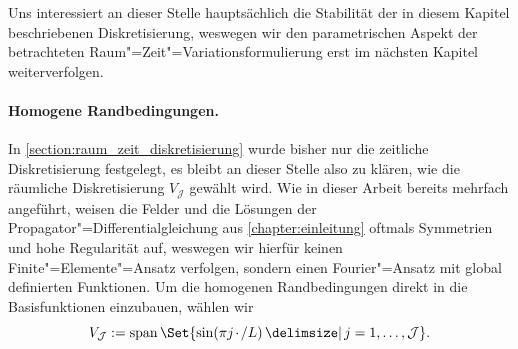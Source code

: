 \documentclass[../main.tex]{subfiles}
\begin{document}
Uns interessiert an dieser Stelle hauptsächlich die Stabilität der in diesem Kapitel beschriebenen Diskretisierung, weswegen wir den parametrischen Aspekt der betrachteten Raum"=Zeit"=Variationsformulierung erst im nächsten Kapitel weiterverfolgen.

\paragraph{Homogene Randbedingungen.} %
\label{par:homogene_randbedingungen_}

In \cref{section:raum_zeit_diskretisierung} wurde bisher nur die zeitliche Diskretisierung festgelegt, es bleibt an dieser Stelle also zu klären, wie die räumliche Diskretisierung $V_{\mathcal J}$ gewählt wird.
Wie in dieser Arbeit bereits mehrfach angeführt, weisen die Felder und die Lösungen der Propagator"=Differentialgleichung aus \cref{chapter:einleitung} oftmals Symmetrien und hohe Regularität auf, weswegen wir hierfür keinen Finite"=Elemente"=Ansatz verfolgen, sondern einen Fourier"=Ansatz mit global definierten Funktionen.
Um die homogenen Randbedingungen direkt in die Basisfunktionen einzubauen, wählen wir
\begin{equation}
    V_{\mathcal J} := \spn \Set{ \sin(\pi j \blank / L) \given j = 1, \dots, \mathcal J}.
\end{equation}
\end{document}
